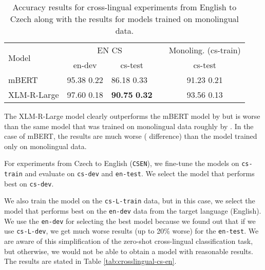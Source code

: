 \documentclass[10pt, a4paper]{article}
\begin{document}
\begin{table}[h!]
\begin{adjustbox}{width=1\linewidth,center}
\begin{tabular}{lllcc} \toprule
\multirow{2}{*}{Model}            & \multicolumn{2}{c}{EN  CS} & &  \multicolumn{1}{c}{ Monoling. (cs-train)}  \\ \cline{2-3} \cline{5-5} 
        & \multicolumn{1}{c}{en-dev}           & \multicolumn{1}{c}{cs-test} & & \multicolumn{1}{c}{cs-test}       \\ \midrule
mBERT & 95.38  0.22     & 86.18  0.33  &   & 91.23  0.21 \\
XLM-R-Large & 97.60  0.18     & \textbf{90.75}  \textbf{0.32}   &  & 93.56  0.13 \\ \bottomrule
\end{tabular}
\end{adjustbox}
\caption{Accuracy results for cross-lingual experiments from English to Czech along with the results for models trained on monolingual data.} \label{tab:crosslingual-en-cs}
\end{table}

\par The XLM-R-Large model clearly outperforms the mBERT model by  but is worse than the same model that was trained on monolingual data roughly by . In the case of mBERT, the results are much worse ( difference) than the model trained only on monolingual data.


For experiments from Czech to English (\texttt{CSEN}), we fine-tune the models on \texttt{cs-train} and evaluate on \texttt{cs-dev} and \texttt{en-test}. We select the model that performs best on \texttt{cs-dev}.

\par We also train the model on the \texttt{cs-L-train} data, but in this case, we select the model that performs best on the \texttt{en-dev} data from the target language (English). We use the \texttt{en-dev} for selecting the best model because we found out that if we use \texttt{cs-L-dev}, we get much worse results (up to 20\% worse) for the \texttt{en-test}. We are aware of this simplification of the zero-shot cross-lingual classification task, but otherwise, we would not be able to obtain a model with reasonable results. The results are stated in Table \ref{tab:crosslingual-cs-en}.
\end{document}

